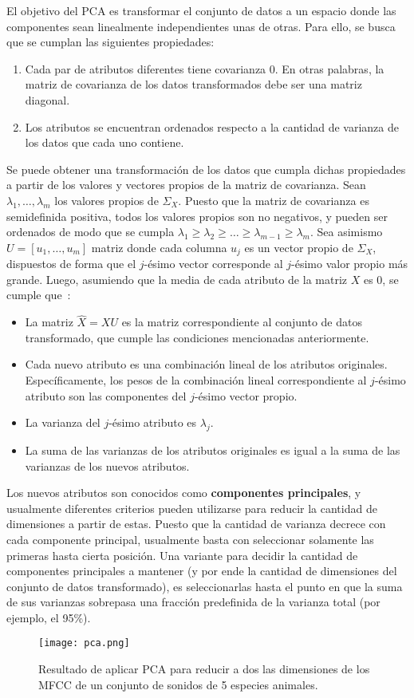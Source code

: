 El objetivo del PCA es transformar el conjunto de datos a un espacio donde las componentes sean linealmente independientes unas de otras.
Para ello, se busca que se cumplan las siguientes propiedades:

\begin{enumerate}
    \item Cada par de atributos diferentes tiene covarianza 0.
    En otras palabras, la matriz de covarianza de los datos transformados debe ser una matriz diagonal.
    \item Los atributos se encuentran ordenados respecto a la cantidad de varianza de los datos que cada uno contiene.
\end{enumerate}

Se puede obtener una transformación de los datos que cumpla dichas propiedades a partir de los valores y vectores propios de la matriz de covarianza.
Sean $\lambda_1,\dots,\lambda_m$ los valores propios de $\Sigma_X$.
Puesto que la matriz de covarianza es semidefinida positiva, todos los valores propios son no negativos, y pueden ser ordenados de modo que se cumpla $\lambda_1 \geq \lambda_2 \geq \dots \geq \lambda_{m-1} \geq \lambda_m$.
Sea asimismo $U = [u_1,\dots,u_m]$ matriz donde cada columna $u_j$ es un vector propio de $\Sigma_X$, dispuestos de forma que el $j$-ésimo vector corresponde al $j$-ésimo valor propio más grande.
Luego, asumiendo que la media de cada atributo de la matriz $X$ es 0, se cumple que~\cite{Smith02,Tan05}:

\begin{itemize}
    \item La matriz $\hat{X} = XU$ es la matriz correspondiente al conjunto de datos transformado, que cumple las condiciones mencionadas anteriormente.
    \item Cada nuevo atributo es una combinación lineal de los atributos originales. Específicamente, los pesos de la combinación lineal correspondiente al $j$-ésimo atributo son las componentes del $j$-ésimo vector propio.
    \item La varianza del $j$-ésimo atributo es $\lambda_j$.
    \item La suma de las varianzas de los atributos originales es igual a la suma de las varianzas de los nuevos atributos.
\end{itemize}

Los nuevos atributos son conocidos como \textbf{componentes principales}, y usualmente diferentes criterios pueden utilizarse para reducir la cantidad de dimensiones a partir de estas.
Puesto que la cantidad de varianza decrece con cada componente principal, usualmente basta con seleccionar solamente las primeras hasta cierta posición.
Una variante para decidir la cantidad de componentes principales a mantener (y por ende la cantidad de dimensiones del conjunto de datos transformado), es seleccionarlas hasta el punto en que la suma de sus varianzas sobrepasa una fracción predefinida de la varianza total (por ejemplo, el 95\%).

\begin{figure}[!h]
    \centering
    \texttt{[image: pca.png]}
    \caption{Resultado de aplicar PCA para reducir a dos las dimensiones de los MFCC de un conjunto de sonidos de 5 especies animales.}
    \label{img:pca}
\end{figure}
